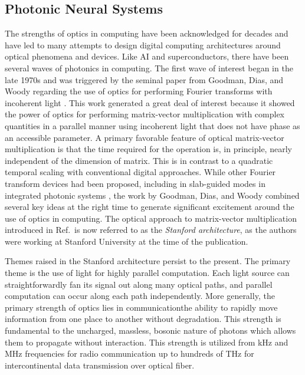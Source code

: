 \subsection{\label{sec:photonic_neural_systems}Photonic Neural Systems}
The strengths of optics in computing have been acknowledged for decades and have led to many attempts to design digital computing architectures around optical phenomena and devices. Like AI and superconductors, there have been several waves of photonics in computing. The first wave of interest began in the late 1970s and was triggered by the seminal paper from Goodman, Dias, and Woody regarding the use of optics for performing Fourier transforms with incoherent light \cite{godi1978}. This work generated a great deal of interest because it showed the power of optics for performing matrix-vector multiplication with complex quantities in a parallel manner using incoherent light that does not have phase as an accessible parameter. A primary favorable feature of optical matrix-vector multiplication is that the time required for the operation is, in principle, nearly independent of the dimension of matrix. This is in contrast to a quadratic temporal scaling with conventional digital approaches. While other Fourier transform devices had been proposed, including in slab-guided modes in integrated photonic systems \cite{shha1968,anbo1977}, the work by Goodman, Dias, and Woody combined several key ideas at the right time to generate significant excitement around the use of optics in computing. The optical approach to matrix-vector multiplication introduced in Ref.\, is now referred to as the \textit{Stanford architecture}, as the authors were working at Stanford University at the time of the publication.

Themes raised in the Stanford architecture persist to the present. The primary theme is the use of light for highly parallel computation. Each light source can straightforwardly fan its signal out along many optical paths, and parallel computation can occur along each path independently. More generally, the primary strength of optics lies in communication\textemdash the ability to rapidly move information from one place to another without degradation. This strength is fundamental to the uncharged, massless, bosonic nature of photons which allows them to propagate without interaction. This strength is utilized from kHz and MHz frequencies for radio communication up to hundreds of THz for intercontinental data transmission over optical fiber.

